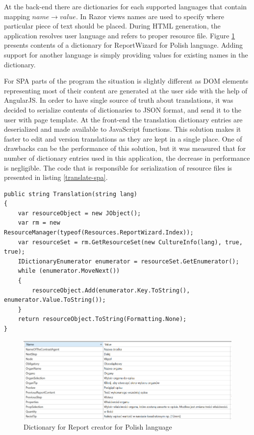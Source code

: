 \documentclass[12pt, twoside, openany]{report}
\theoremstyle{definition}
\begin{document}
At the back-end there are dictionaries for each supported languages that contain mapping $name \to value$. 
In Razor views names are used to specify where particular piece of text should be placed. During HTML generation, the application resolves user language and refers to proper resource file. Figure \ref{fig:language-dictionary} presents contents of a dictionary for ReportWizard for Polish language. Adding support for another language is simply providing values for existing names in the dictionary.

For SPA parts of the program the situation is slightly different as DOM elements representing most of their content are generated at the user side with the help of AngularJS. In order to have single source of truth about translations, it was decided to serialize contents of dictionaries to JSON format, and send it to the user with page template. At the front-end the translation dictionary entries are deserialized and made available to JavaScript functions. This solution makes it faster to edit and version translations as they are kept in a single place. One of drawbacks can be the performance of this solution, but it was measured that for number of dictionary entries used in this application, the decrease in performance is negligible. The code that is responsible for serialization of resource files is presented in listing \ref{translate-spa}.
\pagebreak
\begin{lstlisting}[style=sharpc,caption=Method Translanslation(string lang) serializes all values in a dictionary for a given language and returns a string containing data encoded using JSON format \label{translate-spa}]
public string Translation(string lang)
{
	var resourceObject = new JObject();
	var rm = new ResourceManager(typeof(Resources.ReportWizard.Index));
	var resourceSet = rm.GetResourceSet(new CultureInfo(lang), true, true);
	IDictionaryEnumerator enumerator = resourceSet.GetEnumerator();
	while (enumerator.MoveNext())
	{
		resourceObject.Add(enumerator.Key.ToString(), enumerator.Value.ToString());
	}
	return resourceObject.ToString(Formatting.None);
}
\end{lstlisting}
 
\begin{figure}
    \centering
    \includegraphics[width=1\linewidth]{language-dictionary}
    \caption{Dictionary for Report creator for Polish language\label{fig:language-dictionary}}
\end{figure}
\end{document}
